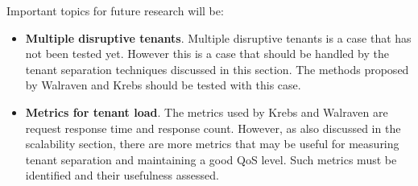 Important topics for future research will be:
\begin{itemize}
	\item \textbf{Multiple disruptive tenants}.
		Multiple disruptive tenants is a case that has not been tested yet. 
		However this is a case that should be handled by the tenant separation techniques discussed in this section.
		The methods proposed by Walraven and Krebs should be tested with this case.
	\item \textbf{Metrics for tenant load}.
		The metrics used by Krebs and Walraven are request response time and response count. 
		However, as also discussed in the scalability section, there are more metrics that may be useful for measuring tenant separation and maintaining a good \ac{QoS} level. Such metrics must be identified and their usefulness assessed.
\end{itemize}

